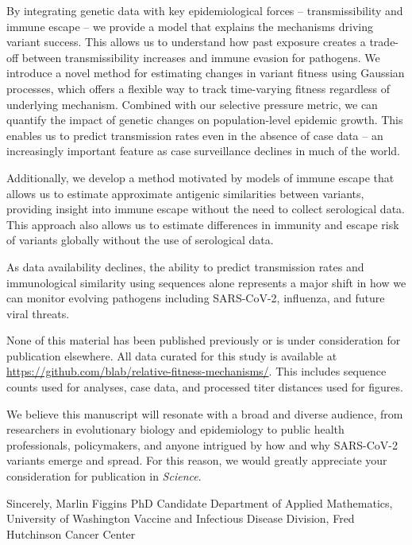 \documentclass[11pt]{article}
\begin{document}
By integrating genetic data with key epidemiological forces -- transmissibility and immune escape -- we provide a model that explains the mechanisms driving variant success.
This allows us to understand how past exposure creates a trade-off between transmissibility increases and immune evasion for pathogens.
We introduce a novel method for estimating changes in variant fitness using Gaussian processes, which offers a flexible way to track time-varying fitness regardless of underlying mechanism.
Combined with our selective pressure metric, we can quantify the impact of genetic changes on population-level epidemic growth.
This enables us to predict transmission rates even in the absence of case data -- an increasingly important feature as case surveillance declines in much of the world.

Additionally, we develop a method motivated by models of immune escape that allows us to estimate approximate antigenic similarities between variants, providing insight into immune escape without the need to collect serological data.
This approach also allows us to estimate differences in immunity and escape risk of variants globally without the use of serological data.

As data availability declines, the ability to predict transmission rates and immunological similarity using sequences alone represents a major shift in how we can monitor evolving pathogens including SARS-CoV-2, influenza, and future viral threats.

None of this material has been published previously or is under consideration for publication elsewhere.
All data curated for this study is available at \href{https://github.com/blab/relative-fitness-mechanisms/}{https://github.com/blab/relative-fitness-mechanisms/}.
This includes sequence counts used for analyses, case data, and processed titer distances used for figures.

We believe this manuscript will resonate with a broad and diverse audience, from researchers in evolutionary biology and epidemiology to public health professionals, policymakers, and anyone intrigued by how and why SARS-CoV-2 variants emerge and spread.
For this reason, we would greatly appreciate your consideration for publication in \textit{Science}.

\vspace{0.3in} %

Sincerely, \newline
\vspace{0.05in} \newline
Marlin Figgins \newline
PhD Candidate \newline
Department of Applied Mathematics, University of Washington \newline
Vaccine and Infectious Disease Division, Fred Hutchinson Cancer Center
\end{document}
